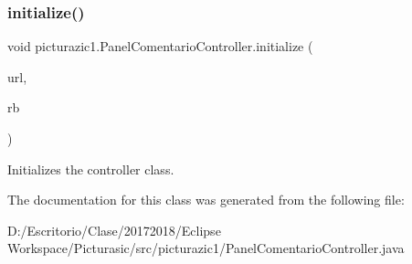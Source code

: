 \subsubsection{\texorpdfstring{initialize()}{initialize()}}
{\footnotesize\ttfamily void picturazic1.\+Panel\+Comentario\+Controller.\+initialize (\begin{DoxyParamCaption}\item[{U\+RL}]{url,  }\item[{Resource\+Bundle}]{rb }\end{DoxyParamCaption})}

Initializes the controller class. 

The documentation for this class was generated from the following file\+:\begin{DoxyCompactItemize}
\item 
D\+:/\+Escritorio/\+Clase/20172018/\+Eclipse Workspace/\+Picturasic/src/picturazic1/Panel\+Comentario\+Controller.\+java\end{DoxyCompactItemize}

